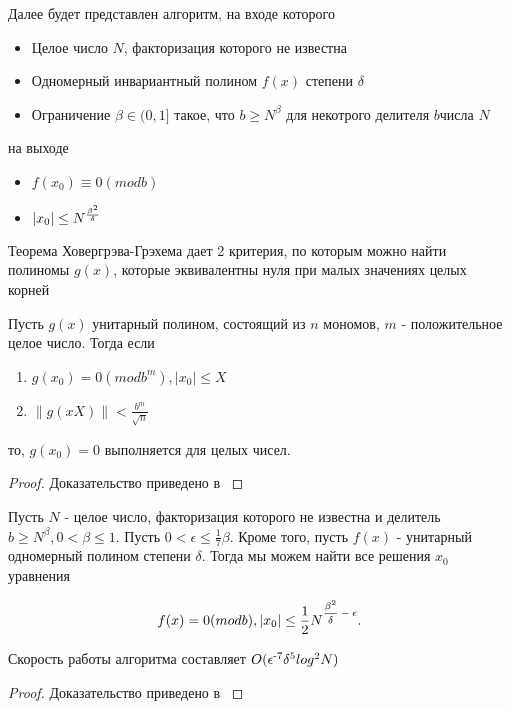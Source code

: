   Далее будет представлен алгоритм, на входе которого  
    \begin{itemize}
     \item Целое число {$N$}, факторизация которого не известна
     \item Одномерный инвариантный полином {$f(x)$} степени {$\delta$}
     \item Ограничение {$\beta \in (0,1]$} такое, что {$b \ge N^\beta$} для некотрого делителя {$b$}числа {$N$}
    \end{itemize}
  на выходе
    \begin{itemize}
     \item {$f(x_0) \equiv 0 (mod b)$}
     \item {$|x_0| \le N\textsuperscript{{$\frac{\beta^2}{\delta}$}}$}
    \end{itemize}
    
  Теорема Ховергрэва-Грэхема дает 2 критерия, по которым можно найти полиномы {$g(x)$}, которые эквивалентны нуля при малых значениях целых корней

  \begin{theorem}
   Пусть {$g(x)$} унитарный полином, состоящий из {$n$} мономов, {$m$} - положительное целое число. Тогда если
   
    \begin{enumerate}
     \item {$g(x_0) = 0(mod b^m), |x_0| \le X$}
     \item {$ \lVert g(x X) \lVert < \frac{b^m}{\sqrt{n}} $}
    \end{enumerate}
    
    то, {$g(x_0) = 0$} выполняется для целых чисел.
    
    \begin{proof}
      Доказательство приведено в \cite[страницы 321-322]{may10}
    \end{proof}

  \end{theorem}

  \begin{theorem}[Копперсмита]
    Пусть {$N$} - целое число, факторизация которого не известна и делитель {$b \ge N^\beta, 0 < \beta \le 1$}. Пусть {$0 < \epsilon \le \frac{1}{7}\beta$}.
    Кроме того, пусть {$f(x)$} - унитарный одномерный полином степени {$\delta$}. Тогда мы можем найти все решения {$x_0$} уравнения
    
      \begin{equation}
       \textit{{$ f(x) = 0 (mod b), |x_0| \le \frac{1}{2} N\textsuperscript{{$\frac{\beta^2}{\delta} - \epsilon$}} $}}.
      \end{equation}

    Скорость работы алгоритма составляет {$O(\epsilon\textsuperscript{-7} \delta^5 log^2 N)$}
    
    \begin{proof}
      Доказательство приведено в \cite[страницы 323-326]{may10}
    \end{proof}

  \end{theorem}

